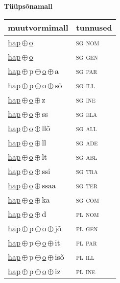 

\vspace{3.5em}
\noindent \begin{minipage}{\textwidth}
\noindent \textbf{Tüüpsõnamall \,}\\

\begin{sideways}
\begin{tabular}{l l}
muutvormimall & tunnused \\
\hline
\underline{hap}\,$\oplus$\,\underline{o} & \textsc{ sg nom } \\
\underline{hap}\,$\oplus$\,\underline{o} & \textsc{ sg gen } \\
\underline{hap}\,$\oplus$\,p\,$\oplus$\,\underline{o}\,$\oplus$\,a & \textsc{ sg par } \\
\underline{hap}\,$\oplus$\,p\,$\oplus$\,\underline{o}\,$\oplus$\,sõ & \textsc{ sg ill } \\
\underline{hap}\,$\oplus$\,\underline{o}\,$\oplus$\,z & \textsc{ sg ine } \\
\underline{hap}\,$\oplus$\,\underline{o}\,$\oplus$\,ss & \textsc{ sg ela } \\
\underline{hap}\,$\oplus$\,\underline{o}\,$\oplus$\,llõ & \textsc{ sg all } \\
\underline{hap}\,$\oplus$\,\underline{o}\,$\oplus$\,ll & \textsc{ sg ade } \\
\underline{hap}\,$\oplus$\,\underline{o}\,$\oplus$\,lt & \textsc{ sg abl } \\
\underline{hap}\,$\oplus$\,\underline{o}\,$\oplus$\,ssi & \textsc{ sg tra } \\
\underline{hap}\,$\oplus$\,\underline{o}\,$\oplus$\,ssaa & \textsc{ sg ter } \\
\underline{hap}\,$\oplus$\,\underline{o}\,$\oplus$\,ka & \textsc{ sg com } \\
\underline{hap}\,$\oplus$\,\underline{o}\,$\oplus$\,d & \textsc{ pl nom } \\
\underline{hap}\,$\oplus$\,p\,$\oplus$\,\underline{o}\,$\oplus$\,jõ & \textsc{ pl gen } \\
\underline{hap}\,$\oplus$\,p\,$\oplus$\,\underline{o}\,$\oplus$\,it & \textsc{ pl par } \\
\underline{hap}\,$\oplus$\,p\,$\oplus$\,\underline{o}\,$\oplus$\,isõ & \textsc{ pl ill } \\
\underline{hap}\,$\oplus$\,p\,$\oplus$\,\underline{o}\,$\oplus$\,iz & \textsc{ pl ine } \\

\end{tabular}
\end{sideways}
\end{minipage}
